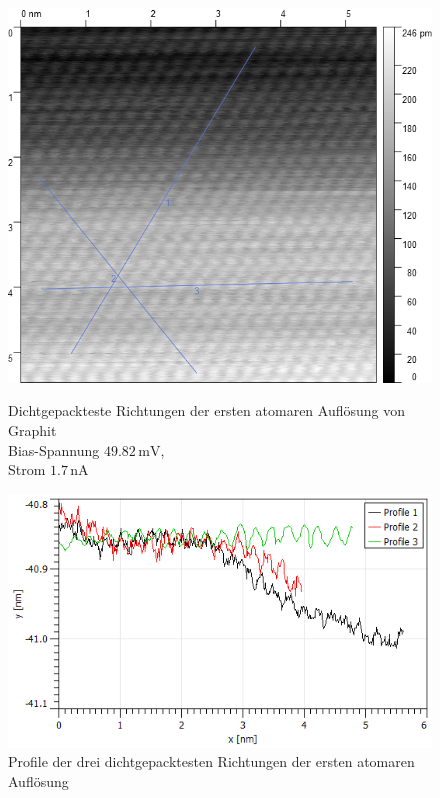 \documentclass[12pt,a4paper]{scrartcl}
\numberwithin{equation}{section} %
\begin{document}
\begin{figure}[h!]
	\centering
	\begin{minipage}[t]{0.4\textwidth}
		\centering
		\includegraphics[width=\textwidth]{../media/B2.5/Atoms1_with_profileLines.png}
		\caption{Dichtgepackteste Richtungen der ersten atomaren Auflösung von Graphit\\
			Bias-Spannung $49.82\mathrm{\,mV}$, \\
			Strom $1.7\mathrm{\,nA}$}
		\label{abb:hopg_with_profile_1}
	\end{minipage}
	\begin{minipage}[t]{0.5\textwidth}
		\centering
		\includegraphics[width=\textwidth]{../media/B2.5/profilePlot_area1.png}
		\caption{Profile der drei dichtgepacktesten Richtungen der ersten atomaren Auflösung}
		\label{abb:hopg_profile_1}
	\end{minipage}
	\vspace{12pt}
	

\end{figure}
\end{document}
